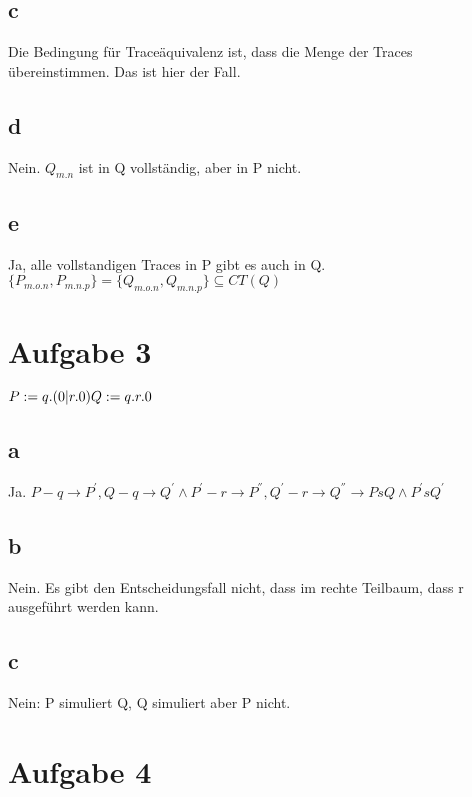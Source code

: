 \documentclass[]{article}
\begin{document}
\subsection{c}
Die Bedingung  für Traceäquivalenz ist, dass die Menge der Traces übereinstimmen. Das ist hier der Fall. 
\subsection{d}
Nein. $Q_{m.n}$ ist in Q vollständig, aber in P nicht.
\subsection{ e}
Ja, alle vollstandigen Traces in P gibt es auch in Q. \\
 $ \{ P_{m.o.n},      P_{m.n.p} \} =  \{ Q_{m.o.n},      Q_{m.n.p}                                                 \}\subseteq CT(Q)      $
 \section{Aufgabe 3}
 
 \textit{$P := q.(0 | r.0)  \\ Q:= q.r.0  $ }
 \subsection{a}
 Ja. $P - q\rightarrow P^{'} , Q-q \rightarrow Q^{'} \land P^{'} -r \rightarrow P^{''} , Q^{'}-r  \rightarrow Q^{''} \longrightarrow PsQ \land P^{'}s Q^{'} $
 
 \subsection{b}
 Nein. Es gibt den Entscheidungsfall nicht, dass im rechte Teilbaum, dass r ausgeführt werden kann.
 
 \subsection{c}
 Nein: P simuliert  Q, Q simuliert aber P nicht.

 \section{Aufgabe 4}

 
\end{document}
